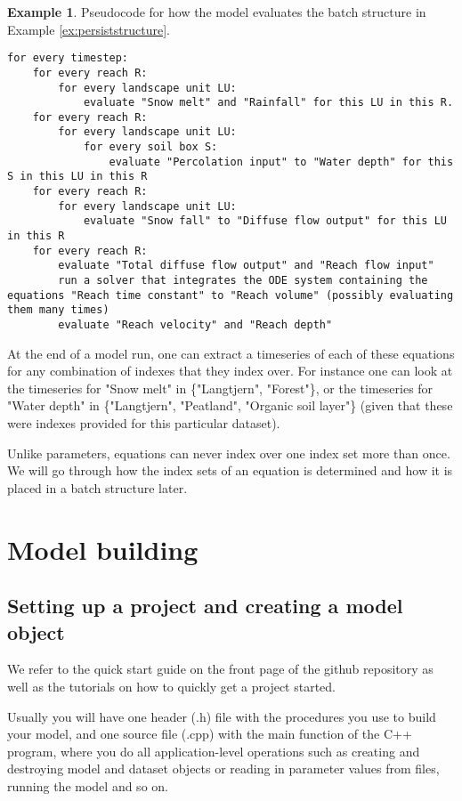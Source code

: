 \documentclass[11pt]{article}
\theoremstyle{definition}
\newtheorem{myexample}{Example}
\newenvironment{example}%
  {\begin{lrbox}{\examplebox}%
   \begin{minipage}{\dimexpr\linewidth-2\fboxsep}
   \begin{myexample}}%
  {\end{myexample}%
   \end{minipage}%
   \end{lrbox}%
   \begin{trivlist}
     \item[]\colorbox{silver}{\usebox\examplebox}
   \end{trivlist}}
\begin{document}
\begin{example}\label{ex:pseucocode}
Pseudocode for how the model evaluates the batch structure in Example \ref{ex:persiststructure}.
\begin{lstlisting}[style=textstyle]
for every timestep:
	for every reach R:
		for every landscape unit LU:
			evaluate "Snow melt" and "Rainfall" for this LU in this R.
	for every reach R:
		for every landscape unit LU:
			for every soil box S:
				evaluate "Percolation input" to "Water depth" for this S in this LU in this R
	for every reach R:
		for every landscape unit LU:
			evaluate "Snow fall" to "Diffuse flow output" for this LU in this R
	for every reach R:
		evaluate "Total diffuse flow output" and "Reach flow input"
		run a solver that integrates the ODE system containing the equations "Reach time constant" to "Reach volume" (possibly evaluating them many times)
		evaluate "Reach velocity" and "Reach depth"
\end{lstlisting}	
\end{example}

At the end of a model run, one can extract a timeseries of each of these equations for any combination of indexes that they index over. For instance one can look at the timeseries for "Snow melt" in \{"Langtjern", "Forest"\}, or the timeseries for "Water depth" in \{"Langtjern", "Peatland", "Organic soil layer"\} (given that these were indexes provided for this particular dataset).

Unlike parameters, equations can never index over one index set more than once. We will go through how the index sets of an equation is determined and how it is placed in a batch structure later.

\section{Model building}\label{sec:modelbuilding}

\subsection{Setting up a project and creating a model object}

We refer to the quick start guide on the front page of the github repository as well as the tutorials on how to quickly get a project started.

Usually you will have one header (.h) file with the procedures you use to build your model, and one source file (.cpp) with the main function of the C++ program, where you do all application-level operations such as creating and destroying model and dataset objects or reading in parameter values from files, running the model and so on.
\end{document}
